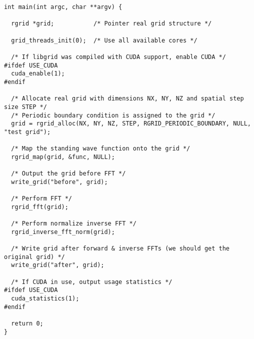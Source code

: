 \documentclass[12pt,letterpaper]{report}
\begin{document}
\begin{verbatim}
int main(int argc, char **argv) {

  rgrid *grid;           /* Pointer real grid structure */

  grid_threads_init(0);  /* Use all available cores */

  /* If libgrid was compiled with CUDA support, enable CUDA */
#ifdef USE_CUDA
  cuda_enable(1);
#endif

  /* Allocate real grid with dimensions NX, NY, NZ and spatial step size STEP */
  /* Periodic boundary condition is assigned to the grid */
  grid = rgrid_alloc(NX, NY, NZ, STEP, RGRID_PERIODIC_BOUNDARY, NULL, "test grid");

  /* Map the standing wave function onto the grid */
  rgrid_map(grid, &func, NULL);

  /* Output the grid before FFT */
  write_grid("before", grid);

  /* Perform FFT */
  rgrid_fft(grid);

  /* Perform normalize inverse FFT */
  rgrid_inverse_fft_norm(grid);

  /* Write grid after forward & inverse FFTs (we should get the original grid) */
  write_grid("after", grid);

  /* If CUDA in use, output usage statistics */
#ifdef USE_CUDA
  cuda_statistics(1);
#endif

  return 0;
}
\end{verbatim}

\end{document}
